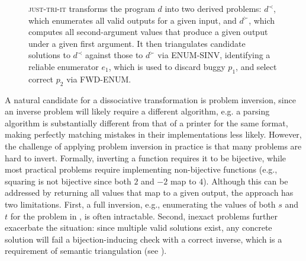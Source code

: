 \documentclass[acmsmall,screen,nonacm]{acmart}
\newcommand{\toolName}{\textsc{just-tri-it}\xspace}
\begin{document}


\begin{figure}[t]
  \centering
  
  \caption{\toolName transforms the program $d$ into two derived problems: $d^{\prec}$, which enumerates all valid outputs for a given input, and $d^{\succ}$, which computes all second-argument values that produce a given output under a given first argument. It then triangulates candidate solutions to $d^{\prec}$ against those to $d^{\succ}$ via ENUM-SINV, identifying a reliable enumerator $e_1$, which is used to discard buggy $p_1$, and select correct $p_2$ via FWD-ENUM.\label{fig:enumsinv}}
  \vspace{-4mm}
\end{figure}%


A natural candidate for a dissociative transformation is problem inversion, since an inverse problem will likely require a different algorithm, e.g. a parsing algorithm is substantially different from that of a printer for the same format, making perfectly matching mistakes in their implementations less likely. However, the challenge of applying problem inversion in practice is that many problems are hard to invert. Formally, inverting a function requires it to be bijective, while most practical problems require implementing non-bijective functions (e.g., squaring is not bijective since both $2$ and $-2$ map to $4$). Although this can be addressed by returning all values that map to a given output, the approach has two limitations. First, a full inversion, e.g., enumerating the values of both $s$ and $t$ for the problem in , is often intractable. Second, inexact problems further exacerbate the situation: since multiple valid solutions exist, any concrete solution will fail a bijection-inducing check with a correct inverse, which is a requirement of semantic triangulation (see ).
\end{document}
